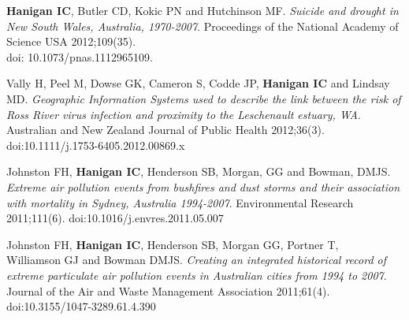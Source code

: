 \documentclass[a4paper,11pt]{article}
\begin{document}
 
\normalsize

 
\renewcommand{\labelenumi}{\textsc{a}\theenumi.}
\begin{revnumerate}

\item \textbf{Hanigan IC}, Butler CD, Kokic PN and Hutchinson MF. \emph{Suicide and drought in New South Wales, Australia, 1970-2007}.  Proceedings of the National Academy of Science USA 2012;109(35).\\
doi: 10.1073/pnas.1112965109.

\item  Vally H, Peel M, Dowse GK, Cameron S, Codde JP, \textbf{Hanigan IC} and Lindsay MD. \emph{Geographic Information Systems used to describe the link between the risk of Ross River virus infection and proximity to the Leschenault estuary, WA}. Australian and New Zealand Journal of Public Health 2012;36(3). doi:10.1111/j.1753-6405.2012.00869.x

\item Johnston FH, \textbf{Hanigan IC}, Henderson SB, Morgan, GG and Bowman, DMJS. \emph{Extreme air pollution events from bushfires and dust storms and their association with mortality in Sydney, Australia 1994-2007}.  Environmental Research 2011;111(6). doi:10.1016/j.envres.2011.05.007

\item Johnston FH, \textbf{Hanigan IC}, Henderson SB, Morgan GG, Portner T, \\
 Williamson GJ and Bowman DMJS. \emph{Creating an integrated historical record of extreme particulate air pollution events in Australian cities from 1994 to 2007}. Journal of the Air and Waste Management Association 2011;61(4). doi:10.3155/1047-3289.61.4.390


\end{revnumerate}
\end{document}
